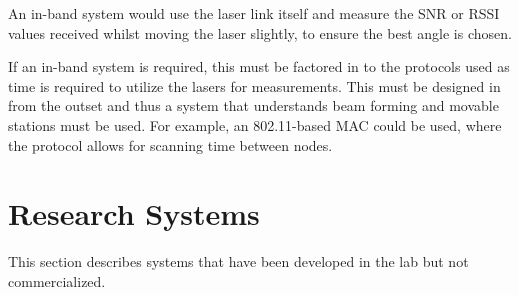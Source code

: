 \documentclass{article}
\begin{document}
An in-band system would use the laser link itself and measure the \ac{SNR} or \ac{RSSI} values received whilst moving the laser slightly, to ensure the best angle is chosen.

If an in-band system is required, this must be factored in to the protocols used as time is required to utilize the lasers for measurements. This must be designed in from the outset and thus a system that understands beam forming and movable stations must be used. For example, an 802.11-based \ac{MAC} could be used, where the protocol allows for scanning time between nodes.

\section{Research Systems}
This section describes systems that have been developed in the lab but not commercialized.
\end{document}
